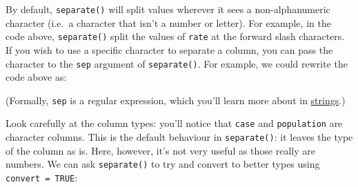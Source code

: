 \documentclass[]{book}
\newenvironment{Shaded}{\begin{snugshade}}{\end{snugshade}}
\newcommand{\KeywordTok}[1]{\textcolor[rgb]{0.13,0.29,0.53}{\textbf{{#1}}}}
\newcommand{\DataTypeTok}[1]{\textcolor[rgb]{0.13,0.29,0.53}{{#1}}}
\newcommand{\StringTok}[1]{\textcolor[rgb]{0.31,0.60,0.02}{{#1}}}
\newcommand{\CommentTok}[1]{\textcolor[rgb]{0.56,0.35,0.01}{\textit{{#1}}}}
\newcommand{\OtherTok}[1]{\textcolor[rgb]{0.56,0.35,0.01}{{#1}}}
\newcommand{\NormalTok}[1]{{#1}}
\begin{document}
By default, \texttt{separate()} will split values wherever it sees a
non-alphanumeric character (i.e.~a character that isn't a number or
letter). For example, in the code above, \texttt{separate()} split the
values of \texttt{rate} at the forward slash characters. If you wish to
use a specific character to separate a column, you can pass the
character to the \texttt{sep} argument of \texttt{separate()}. For
example, we could rewrite the code above as:

\begin{Shaded}
\end{Shaded}

(Formally, \texttt{sep} is a regular expression, which you'll learn more
about in \protect\hyperlink{strings}{strings}.)

Look carefully at the column types: you'll notice that \texttt{case} and
\texttt{population} are character columns. This is the default behaviour
in \texttt{separate()}: it leaves the type of the column as is. Here,
however, it's not very useful as those really are numbers. We can ask
\texttt{separate()} to try and convert to better types using
\texttt{convert\ =\ TRUE}:

\begin{Shaded}
\end{Shaded}
\end{document}
